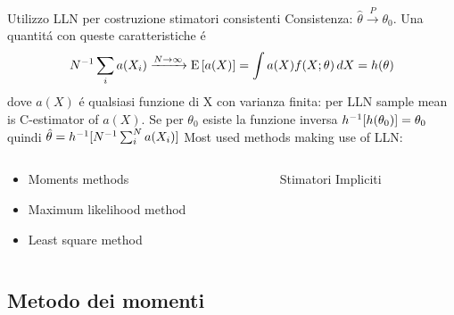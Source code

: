 \documentclass[asd-beamer.tex]{subfiles}%
\begin{document}
\begin{frame}{Utilizzo LLN per costruzione stimatori consistenti}\frameintoc
Consistenza: $\hat{\theta}\xrightarrow{P}\theta_0$. Una quantit\'a con queste caratteristiche \'e
\[{N}^{-1}\sum_ia(X_i)\xrightarrow{N\to\infty}\operatorname{E}{[a(X)]}=\int a(X)f(X;\theta)\,dX=h(\theta)\]
dove $a(X)$ \'e qualsiasi funzione di X con varianza finita: per LLN sample mean is C-estimator of $a(X)$. Se per $\theta_0$ esiste la funzione inversa ${h}^{-1}[h(\theta_0)]=\theta_0$ quindi $\hat{\theta}={h}^{-1}[{N}^{-1}\sum_i^Na(X_i)]$
Most used methods making use of LLN:
\begin{columns}[T]
    \begin{column}{0.5\textwidth}
\begin{itemize}
\item Moments methods
\item Maximum likelihood method
\item Least square method
\end{itemize}
    \end{column}
    \begin{column}{0.5\textwidth}
        Stimatori Impliciti
    \end{column}
\end{columns}
\end{frame}

\subsection{Metodo dei momenti}
\end{document}

